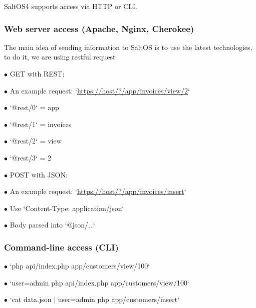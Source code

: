 \documentclass[a4paper]{article}
\def\htmladdnormallink#1#2{\href{#2}{#1}}
\begin{document}
SaltOS4 supports access via HTTP or CLI.

\hypertarget{toc9}{}
\subsubsection{Web server access (Apache, Nginx, Cherokee)}

The main idea of sending information to SaltOS is to use the latest technologies, to do it, we are using restful request

\begin{compactitem}
\item[\color{myblue}$\bullet$] GET with REST:
  \begin{compactitem}
  \item[\color{myblue}$\bullet$] An example request: `\htmladdnormallink{https://host/?/app/invoices/view/2}{https://host/?/app/invoices/view/2}`
  \item[\color{myblue}$\bullet$] `@rest/0` = app
  \item[\color{myblue}$\bullet$] `@rest/1` = invoices
  \item[\color{myblue}$\bullet$] `@rest/2` = view
  \item[\color{myblue}$\bullet$] `@rest/3` = 2
  \end{compactitem}
\item[\color{myblue}$\bullet$] POST with JSON:
  \begin{compactitem}
  \item[\color{myblue}$\bullet$] An example request: `\htmladdnormallink{https://host/?/app/invoices/insert}{https://host/?/app/invoices/insert}`
  \item[\color{myblue}$\bullet$] Use `Content-Type: application/json`
  \item[\color{myblue}$\bullet$] Body parsed into `@json/...`
  \end{compactitem}
\end{compactitem}

\hypertarget{toc10}{}
\subsubsection{Command-line access (CLI)}

\begin{compactitem}
\item[\color{myblue}$\bullet$] `php api/index.php app/customers/view/100`
\item[\color{myblue}$\bullet$] `user=admin php api/index.php app/customers/view/100`
\item[\color{myblue}$\bullet$] `cat data.json $|$ user=admin php app/customers/insert`
\end{compactitem}
\end{document}
